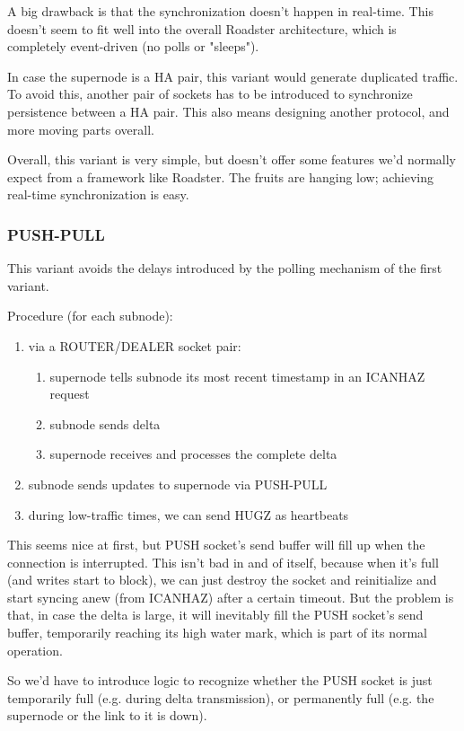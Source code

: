A big drawback is that the synchronization doesn't happen in real-time. This
doesn't seem to fit well into the overall Roadster architecture, which is
completely event-driven (no polls or "sleeps").

In case the supernode is a HA pair, this variant would generate duplicated
traffic. To avoid this, another pair of sockets has to be introduced to
synchronize persistence between a HA pair. This also means designing another
protocol, and more moving parts overall.

Overall, this variant is very simple, but doesn't offer some features we'd
normally expect from a framework like Roadster. The fruits are hanging low;
achieving real-time synchronization is easy.

\subsubsection{PUSH-PULL}
This variant avoids the delays introduced by the polling mechanism of the first variant.

Procedure (for each subnode):
\begin{enumerate}
	\item via a ROUTER/DEALER socket pair:
		\begin{enumerate}
			\item supernode tells subnode its most recent timestamp in an ICANHAZ request
			\item subnode sends delta
			\item supernode receives and processes the complete delta
		\end{enumerate}
	\item subnode sends updates to supernode via PUSH-PULL
	\item during low-traffic times, we can send HUGZ as heartbeats
\end{enumerate}

This seems nice at first, but PUSH socket's send buffer will fill up when the
connection is interrupted.  This isn't bad in and of itself, because when it's
full (and writes start to block), we can just destroy the socket and
reinitialize and start syncing anew (from ICANHAZ) after a certain timeout.
But the problem is that, in case the delta is large, it will inevitably fill
the PUSH socket's send buffer, temporarily reaching its high water mark, which
is part of its normal operation.

So we'd have to introduce logic to recognize whether the PUSH
socket is just temporarily full (e.g. during delta transmission), or
permanently full (e.g. the supernode or the link to it is down).

